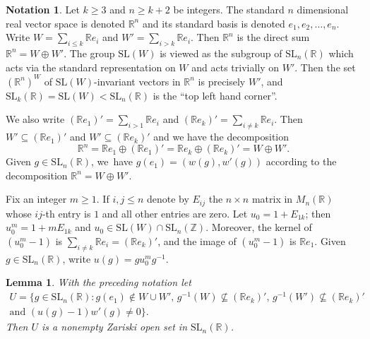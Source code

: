 \documentclass[JEP,XML,SOM,Unicode,published]{cedram}
\newtheorem{lemma}{Lemma}
\theoremstyle{definition}
\newtheorem{notation}{Notation}
\newcommand{\field}[1]{\mathbb{#1}}
\newcommand{\R}{\field{R}}
\newcommand{\Z}{\field{Z}}
\newcommand{\SL}{\mathrm{SL}}
\begin{document}
\begin{notation} Let $k\geq 3$ and $n\geq k+2$ be integers. The standard $n$ dimensional real vector space is denoted $\R ^n$ and its standard basis is denoted $e_1,e_2,\dots,e_n$. Write $W=\sum_{i\leq k} \R e_i$ and $W'=\sum_{i>k}\R e_i$. Then $\R^n$ is the direct sum $\R^n=W\oplus W'$. The group $\SL(W)$ is viewed as the subgroup of $\SL_n(\R)$ which acts via the standard representation on $W$ and acts trivially on $W'$. Then the set $(\R ^n)^W$ of $\SL(W)$-invariant vectors in $\R^n$ is precisely $W'$, and $\SL_k(\R)=\SL(W)<\SL_n(\R)$ is the ``top left hand corner''.

We also write $(\R e_1)' =\sum_{i>1} \R e_i$ and $(\R e_k)' =\sum_{i\neq k} \R e_i$. Then $W'\subseteq (\R e_1)'$ and $W'\subseteq (\R e_k)'$ and we have the decomposition\vspace*{-3pt}
\begin{equation} \label{decomposition}
\R ^n= \R e_1 \oplus (\R e_1)'= \R e_k\oplus (\R e_k)' = W \oplus W'.
\end{equation}
Given $g\in \SL_n(\R)$, we~have $g(e_1)=(w(g),w'(g))$ according to the decomposition $\R ^n=W\oplus W'$.

Fix an integer $m\geq 1$. If $i,j\leq n$ denote by $E_{ij}$ the $n\times n$ matrix in $M_n(\R)$ whose $ij$-th entry is $1$ and all other entries are zero. Let $u_0=1+E_{1k}$; then $u_0^m=1+mE_{1k}$ and $u_0\in \SL(W)\cap \SL_n(\Z) $. Moreover, the kernel of $(u_0^m-1)$ is $\sum_{i\neq k} \R e_i= (\R e_k)'$, and the image of $(u_0^m-1)$ is $\R e_1$. Given $g\in \SL_n(\R)$, write $u(g)=gu_0^mg^{-1}$.
\end{notation}

\begin{lemma} \label{zariskiopenU} With the preceding notation let\vspace*{-3pt}
\begin{multline*}
U=\bigl\{ g\in \SL_n(\R): g(e_1) \notin W \cup W',\, g^{-1}(W) \not \subseteq (\R e_k)',\, g^{-1}(W') \not \subseteq (\R e_k)' \\
\text{and }(u(g)-1)w'(g)\neq 0 \bigr\}.
\end{multline*}
Then $U$ is a \emph{nonempty} Zariski open set in $\SL_n(\R)$.
\end{lemma}
\end{document}

